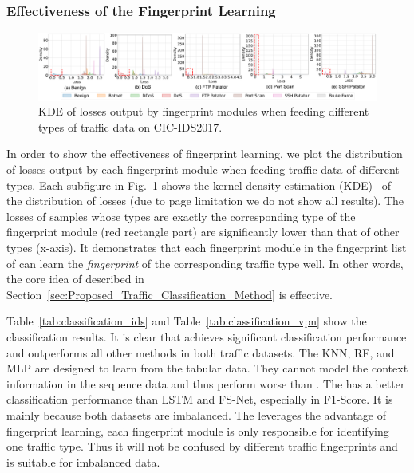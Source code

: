 \subsubsection{Effectiveness of the Fingerprint Learning}
\begin{figure}[htbp]
	\centering
	\includegraphics[scale=0.4]{figs/loss_kde.pdf}
	\caption{KDE of losses output by fingerprint modules when feeding different types of traffic data on CIC-IDS2017.}
	\label{fig:loss_kde}
\end{figure}
In order to show the effectiveness of fingerprint learning, we plot the distribution of losses output by each fingerprint module when feeding traffic data of different types.
Each subfigure in Fig.~\ref{fig:loss_kde} shows the kernel density estimation (KDE)~\cite{silverman2018density} of the distribution of losses (due to page limitation we do not show all results).
The losses of samples whose types are exactly the corresponding type of the fingerprint module (red rectangle part) are significantly lower than that of other types (x-axis). 
It demonstrates that each fingerprint module in the fingerprint list of \sys can learn the \emph{fingerprint} of the corresponding traffic type well. 
In other words, the core idea of \sys described in Section~\ref{sec:Proposed_Traffic_Classification_Method} is effective. 

Table~\ref{tab:classification_ids} and Table~\ref{tab:classification_vpn} show the classification results. 
It is clear that \sys achieves significant classification performance and outperforms all other methods in both traffic datasets.
The KNN, RF, and MLP are designed to learn from the tabular data. 
They cannot model the context information in the sequence data and thus perform worse than \sys.
The \sys has a better classification performance than LSTM and FS-Net, especially in F1-Score.
It is mainly because both datasets are imbalanced.
The \sys leverages the advantage of fingerprint learning, \ie each fingerprint module is only responsible for identifying one traffic type. 
Thus it will not be confused by different traffic fingerprints and is suitable for imbalanced data. 


